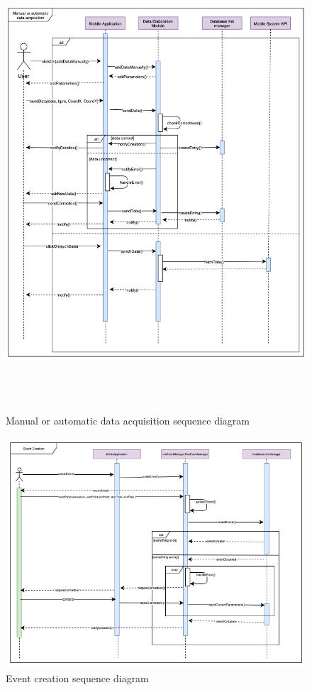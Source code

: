 \begin{figure}[h!]
\centering
\includegraphics[height=17.00cm,keepaspectratio]{Figures/DataAcquisition}
\caption{Manual or automatic data acquisition sequence diagram}
\end{figure}

\begin{figure}
\centering
\includegraphics[width=\textwidth]{Figures/EventCreation}
\caption{Event creation sequence diagram}
\end{figure}